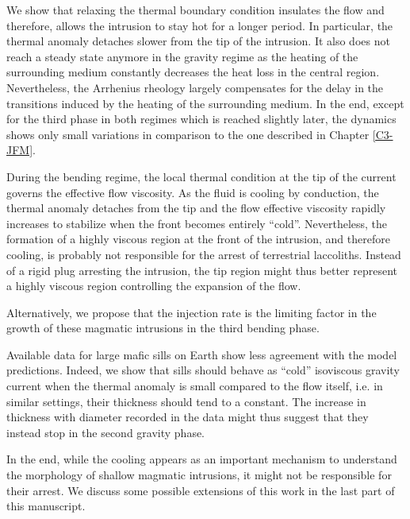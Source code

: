 We show  that relaxing  the thermal  boundary condition  insulates the
flow and  therefore, allows  the intrusion  to stay  hot for  a longer
period.  In particular,  the thermal anomaly detaches  slower from the
tip of the  intrusion.  It also does not reach  a steady state anymore
in  the  gravity regime  as  the  heating  of the  surrounding  medium
constantly    decreases    the    heat    loss    in    the    central
region. Nevertheless,  the Arrhenius rheology largely  compensates for
the delay in the transitions induced by the heating of the surrounding
medium.  In the end, except for  the third phase in both regimes which
is reached slightly later, the dynamics shows only small variations in
comparison to the one described in Chapter \ref{C3-JFM}.

During the bending  regime, the local thermal condition at  the tip of
the current  governs the  effective flow viscosity.   As the  fluid is
cooling by conduction,  the thermal anomaly detaches from  the tip and
the flow effective  viscosity rapidly increases to  stabilize when the
front  becomes entirely  ``cold''.  Nevertheless,  the formation  of a
highly viscous  region at  the front of  the intrusion,  and therefore
cooling, is  probably not  responsible for  the arrest  of terrestrial
laccoliths. Instead of  a rigid plug arresting the  intrusion, the tip
region might thus better represent a highly viscous region controlling
the expansion of the flow.

Alternatively,  we propose  that the  injection rate  is the  limiting
factor in the growth of these magmatic intrusions in the third bending
phase.

Available data for large mafic sills on Earth show less agreement with
the model  predictions.  Indeed, we  show that sills should  behave as
``cold'' isoviscous gravity current when  the thermal anomaly is small
compared  to  the  flow  itself,  i.e.   in  similar  settings,  their
thickness should tend  to a constant.  The increase  in thickness with
diameter recorded  in the  data might thus  suggest that  they instead
stop in the second gravity phase.

In the  end, while the  cooling appears  as an important  mechanism to
understand the morphology of shallow magmatic intrusions, it might not
be responsible for their arrest.   We discuss some possible extensions
of this work in the last part of this manuscript.



